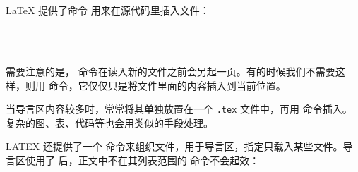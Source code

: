 \LaTeX{} 提供了命令 \lstinline{} 用来在源代码里插入文件：

\begin{lstlisting}



\end{lstlisting}

需要注意的是，\lstinline{} 命令在读入新的文件之前会另起一页。有的时候我们不需要这样，则用\lstinline{} 命令，它仅仅只是将文件里面的内容插入到当前位置。

当导言区内容较多时，常常将其单独放置在一个 \lstinline{.tex} 文件中，再用 \lstinline{} 命令插入。复杂的图、表、代码等也会用类似的手段处理。

LATEX 还提供了一个 \lstinline{} 命令来组织文件，用于导言区，指定只载入某些文件。导言区使用了 \lstinline{} 后，正文中不在其列表范围的 \lstinline{}命令不会起效：
\begin{lstlisting}

\end{lstlisting}

